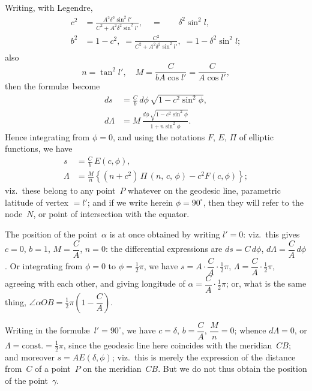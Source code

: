 \documentclass[11pt,a4paper]{article}
\theoremstyle{plain}
\theoremstyle{definition}
\begin{document}
\clearpage

Writing, with Legendre,
\begin{align*}
c^2 &= \frac{A^2\delta^2\sin^2 l'}{C^2 + A^2\delta^2\sin^2 l'},
    \quad= \phantom{1-{}\,}\delta^2\sin^2 l, \\
b^2 &= 1 - c^2,
    \;= \frac{C^2}{C^2 + A^2\delta^2\sin^2 l'},
    \;= 1 - \delta^2\sin^2 l;
\end{align*}
also
\[
n = \tan^2 l', \quad M = \frac{C}{bA\cos l'} = \frac{C}{A\cos l'},
\]
then the formul\ae\ become
\begin{align*}
ds &= \frac{C}{b}\,d\phi\,\sqrt{1 - c^2\sin^2\phi}, \\
d\Lambda &= M\,\frac{d\phi\,\sqrt{1 - c^2\sin^2\phi}}{1 + n\sin^2\phi}.
\end{align*}
Hence integrating from $\phi=0$, and using the notations $F$, $E$, $\Pi$ of elliptic functions,
we have
\begin{align*}
s &= \frac{C}{b}\,E(c,\phi), \\
\Lambda &= \frac{M}{n}\left\{(n + c^2)\,\Pi\,(n,\,c,\,\phi) - c^2F(c,\phi)\right\};
\end{align*}
viz.\ these belong to any point~$P$ whatever on the geodesic line, parametric latitude
of vertex $=l'$; and if we write herein $\phi = 90^\circ$, then they will refer to the node~$N$,
or point of intersection with the equator.

The position of the point~$\alpha$ is at once obtained by writing $l'=0$: viz.\ this gives
$c=0$, $b=1$, $M = \dfrac{C}{A}$, $n=0$: the differential expressions are $ds = C\,d\phi$, $d\Lambda = \dfrac{C}{A}\,d\phi$.  Or
integrating from $\phi=0$ to $\phi = \tfrac{1}{2}\pi$, we have $s = A \cdot \dfrac{C}{A} \cdot \tfrac{1}{2}\pi$, $\Lambda = \dfrac{C}{A} \cdot \tfrac{1}{2}\pi$, agreeing with each
other, and giving longitude of $\alpha = \dfrac{C}{A} \cdot \tfrac{1}{2}\pi$; or, what is the same thing,
$\angle\alpha OB = \tfrac{1}{2}\pi\left(1 - \dfrac{C}{A}\right)$.

Writing in the formul\ae\ $l' = 90^\circ$, we have $c=\delta$, $b = \dfrac{C}{A}$, $\dfrac{M}{n} = 0$; whence $d\Lambda = 0$, or
$\Lambda = \text{const.} = \tfrac{1}{2}\pi$, since the geodesic line here coincides with the meridian~$CB$; and
moreover $s = AE(\delta,\phi)$; viz.\ this is merely the expression of the distance from~$C$ of
a point~$P$ on the meridian~$CB$.  But we do not thus obtain the position of the point~$\gamma$.
\end{document}
